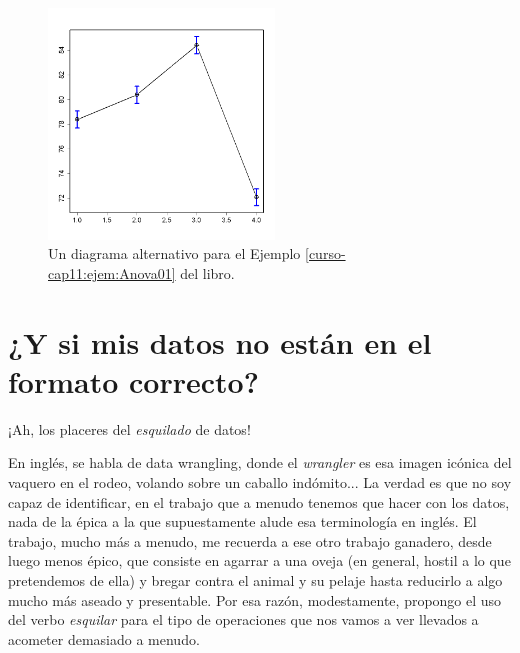 \documentclass[10pt,a4paper]{article}\usepackage[]{graphicx}\usepackage[]{color}
\newcounter {cont01}
\begin{document}
\begin{figure}[htb]
\begin{center}
    \includegraphics[width=6cm]{../fig/Tut11-05.png}
\end{center}
\caption{Un diagrama alternativo para el Ejemplo \ref{curso-cap11:ejem:Anova01} del libro.}
\label{tut11:fig:DiagramaAlternativoEjemploAnova}
\end{figure}





\section{¿Y si mis datos no están en el formato correcto?}
\label{tut11:sec:DatosFormatoNoCorrecto}

¡Ah, los placeres del {\em esquilado} de datos!

En inglés, se habla de {\sf data wrangling}, donde el {\em wrangler} es esa imagen icónica del vaquero en el rodeo, volando sobre un caballo indómito... La verdad es que no soy capaz de identificar, en el trabajo que a menudo tenemos que hacer con los datos, nada de la épica a la que supuestamente alude esa terminología en inglés. El trabajo, mucho más a menudo, me recuerda a ese otro trabajo ganadero, desde luego menos épico, que consiste en agarrar a una oveja (en general, hostil a lo que pretendemos de ella) y bregar contra el animal y su pelaje hasta reducirlo a algo mucho más aseado y presentable. Por esa razón, modestamente, propongo el uso del verbo {\em esquilar} para el tipo de operaciones que nos vamos a ver llevados a acometer demasiado a menudo.
\end{document}
